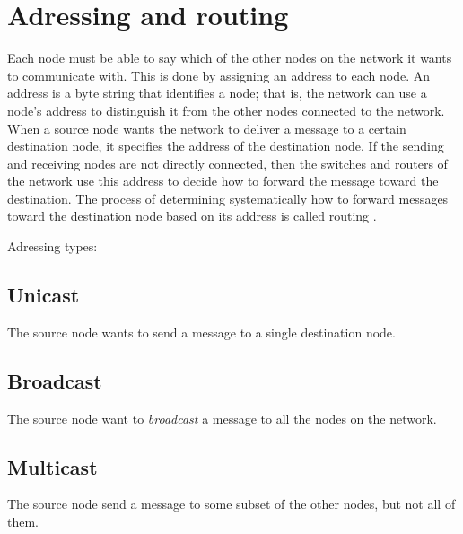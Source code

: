 
\section{Adressing and routing}

Each node must be able to say which of the other nodes on the 
network it wants to communicate with. This is done by assigning
an address to each node. An address is a byte string that identiﬁes a node;
that is, the network can use a node’s address to distinguish it from the other
nodes connected to the network. When a source node wants the network to
deliver a message to a certain destination node, it speciﬁes the address of
the destination node. If the sending and receiving nodes are not directly
connected, then the switches and routers of the network use this address to
decide how to forward the message toward the destination. The process of
determining systematically how to forward messages toward the destination node
based on its address is called routing \cite{PetersonDavie:2003}.

Adressing types: 

	\subsection{Unicast}
	The source node wants to send a message to a single destination node.
	
	\subsection{Broadcast}
	The source node want to \emph{broadcast} a message to all the 
	nodes on the network.
	
	\subsection{Multicast}
	The source node send a message to some subset of the 
	other nodes, but not all of them.
	

	
	
	
